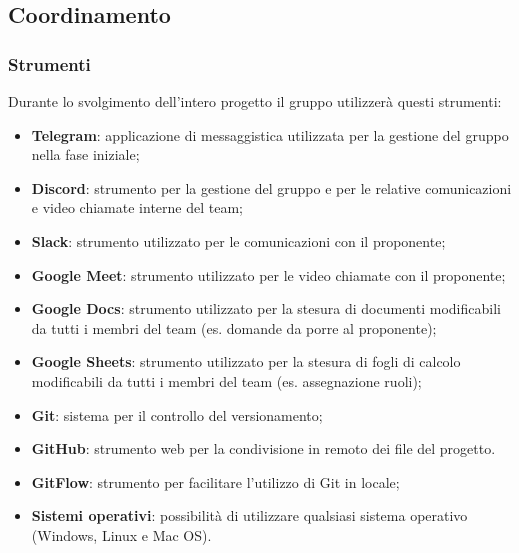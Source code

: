 \subsection{Coordinamento}











\subsubsection{Strumenti}
Durante lo svolgimento dell'intero progetto il gruppo utilizzerà questi strumenti:
\begin{itemize}
	\item \textbf{Telegram}: applicazione di messaggistica utilizzata per la gestione del gruppo nella fase iniziale;
	\item \textbf{Discord}: strumento per la gestione del gruppo e per le relative comunicazioni e video chiamate interne del team;
	\item \textbf{Slack}: strumento utilizzato per le comunicazioni con il proponente;
	\item \textbf{Google Meet}: strumento utilizzato per le video chiamate con il proponente;
	\item \textbf{Google Docs}: strumento utilizzato per la stesura di documenti modificabili da tutti i membri del team (es. domande da porre al proponente);
	\item \textbf{Google Sheets}: strumento utilizzato per la stesura di fogli di calcolo modificabili da tutti i membri del team (es. assegnazione ruoli);
	\item \textbf{Git}: sistema per il controllo del versionamento;
	\item \textbf{GitHub}: strumento web per la condivisione in remoto dei file del progetto.
	\item \textbf{GitFlow}: strumento per facilitare l'utilizzo di Git in locale;
	\item \textbf{Sistemi operativi}: possibilità di utilizzare qualsiasi sistema operativo (Windows, Linux e Mac OS).
\end{itemize}